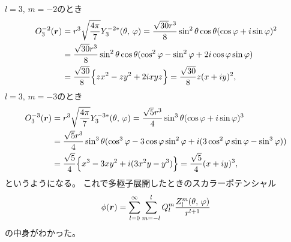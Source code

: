 \documentclass[../master.tex]{subfiles}
\begin{document}
\(l=3,\,m=-2\)のとき
\begin{equation}\begin{aligned}[b]
    O_3^{-2}(\vb*{r})
    &= r^3 \sqrt{\frac{4\pi}{7}} Y_3^{-2*}(\theta,\,\varphi)
    = \frac{\sqrt{30}r^3}{8} \sin^2\theta \cos\theta (\cos\varphi+i\sin\varphi)^2\\
    &= \frac{\sqrt{30}r^3}{8} \sin^2\theta \cos\theta (\cos^2\varphi - \sin^2\varphi + 2i\cos\varphi\sin\varphi)\\
    &= \frac{\sqrt{30}}{8} \Big\{zx^2-zy^2 + 2ixyz\Big\}
    = \frac{\sqrt{30}}{8} z(x+iy)^2,
\end{aligned}\end{equation}
\(l=3,\,m=-3\)のとき
\begin{equation}\begin{aligned}[b]
    O_3^{-3}(\vb*{r})
    &= r^3 \sqrt{\frac{4\pi}{7}} Y_3^{-3*}(\theta,\,\varphi)
    = \frac{\sqrt{5}r^3}{4} \sin^3\theta (\cos\varphi+i\sin\varphi)^3\\
    &= \frac{\sqrt{5}r^3}{4} \sin^3\theta (\cos^3\varphi - 3\cos\varphi\sin^2\varphi + i(3\cos^2\varphi\sin\varphi-\sin^3\varphi))\\
    &= \frac{\sqrt{5}}{4} \Big\{x^3-3xy^2+i(3x^2y-y^3)\Big\}
    = \frac{\sqrt{5}}{4} (x+iy)^3,
\end{aligned}\end{equation}
というようになる。
これで多極子展開したときのスカラーポテンシャル
\begin{equation}
    \phi(\vb*{r}) = \sum_{l=0}^{\infty} \sum_{m=-l}^{l} Q_l^m\frac{Z_l^m(\theta,\,\varphi)}{r^{l+1}}
\end{equation}
の中身がわかった。
\end{document}
